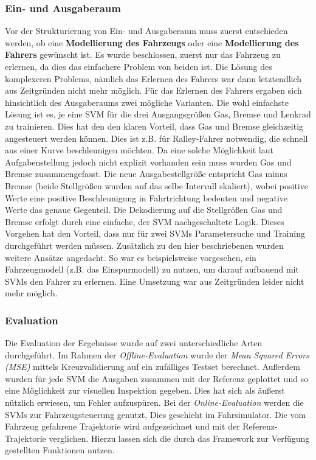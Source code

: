 \subsubsection{Ein- und Ausgaberaum}
\label{subsubsec:EinundAusgaberaum}
Vor der Strukturierung von Ein- und Ausgaberaum muss zuerst entschieden werden, ob eine \textbf{Modellierung des Fahrzeugs} oder eine \textbf{Modellierung des Fahrers} gewünscht ist. Es wurde beschlossen, zuerst nur das Fahrzeug zu erlernen, da dies das einfachere Problem von beiden ist. Die Lösung des komplexeren Problems, nämlich das Erlernen des Fahrers war dann letztendlich aus Zeitgründen nicht mehr möglich.
Für das Erlernen des Fahrers ergaben sich hinsichtlich des Ausgaberaums zwei mögliche Varianten. Die wohl einfachste Lösung ist es, je eine SVM für die drei Ausgangsgrößen Gas, Bremse und Lenkrad zu trainieren. Dies hat den den klaren Vorteil, dass Gas und Bremse gleichzeitig angesteuert werden können. Dies ist z.B. für Ralley-Fahrer notwendig, die schnell aus einer Kurve beschleunigen möchten.
Da eine solche Möglichkeit laut Aufgabenstellung jedoch nicht explizit vorhanden sein muss wurden Gas und Bremse zusammengefasst. Die neue Ausgabestellgröße entspricht Gas minus Bremse (beide Stellgrößen wurden auf das selbe Intervall skaliert), wobei positive Werte eine positive Beschleunigung in Fahrtrichtung bedeuten und negative Werte das genaue Gegenteil.
Die Dekodierung auf die Stellgrößen Gas und Bremse erfolgt durch eine einfache, der SVM nachgeschaltete Logik. Dieses Vorgehen hat den Vorteil, dass nur für zwei SVMs Parametersuche  und Training durchgeführt werden müssen.
Zusätzlich zu den hier beschriebenen wurden weitere Ansätze angedacht. So war es beispielsweise vorgesehen,  ein Fahrzeugmodell (z.B. das Einspurmodell) zu nutzen, um darauf aufbauend mit SVMs den Fahrer zu erlernen. Eine Umsetzung war aus Zeitgründen leider nicht mehr möglich.

\subsubsection{Evaluation}
\label{subsubsec:Evaluation}
Die Evaluation der Ergebnisse wurde auf zwei unterschiedliche Arten durchgeführt. Im Rahmen der \textit{Offline-Evaluation} wurde der \textit{Mean Squared Errors (MSE)} mittels Kreuzvalidierung auf ein zufälliges Testset berechnet. Außerdem wurden für jede SVM die Ausgaben zusammen mit der Referenz geplottet und so eine Möglichkeit zur visuellen Inspektion gegeben. Dies hat sich als äußerst nützlich erwiesen, um Fehler aufzuspüren.
Bei der \textit{Online-Evaluation} werden die SVMs zur Fahrzeugsteuerung genutzt, Dies geschieht im Fahrsimulator. Die vom Fahrzeug gefahrene Trajektorie wird aufgezeichnet und mit der Referenz-Trajektorie verglichen. Hierzu lassen sich die durch das Framework zur Verfügung gestellten Funktionen nutzen.


